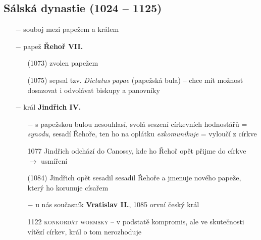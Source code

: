 \documentclass{article}
\begin{document}
\subsection*{Sálská dynastie (1024 -- 1125)}
\begin{minipage}{0.6\textwidth}
    \begin{itemize}
        \vspace{-0.5em}
        \setlength\itemsep{0.15em}
        \item[$-$] souboj mezi papežem a králem
        \item[$-$] papež \textbf{Řehoř VII.}
            \begin{itemize}
                \vspace{-0.5em}
                \setlength\itemsep{0.15em}
                \item[(1073)] zvolen papežem
                \item[(1075)] sepsal tzv. \textit{Dictatus papae} (papežská bula) -- chce mít možnost dosazovat i odvolávat biskupy a panovníky
            \end{itemize}
        \item[$-$] král \textbf{Jindřich IV.}
            \begin{itemize}
                \vspace{-0.5em}
                \setlength\itemsep{0.15em}
                \item[$-$] s papežskou bulou nesouhlasí, svolá seszení církevních hodnostářů = \textit{synodu}, sesadí Řehoře, ten ho na oplátku \textit{exkomunikuje} = vyloučí z církve
                \item[1077] Jindřich odchází do Canossy, kde ho Řehoř opět přijme do církve $\rightarrow$ usmíření
                \item[(1084)] Jindřich opět sesadil sesadil Řehoře a jmenuje nového papeže, který ho korunuje císařem
                \item[$-$] u nás současník \textbf{Vratislav II.}, 1085 orvní český král
                \item[1122] \textsc{konkordát wormský} -- v podstatě kompromis, ale ve skutečnosti vítězí církev, král o tom nerozhoduje
            \end{itemize}
    \end{itemize}
\end{minipage}
\hfill
\end{document}
